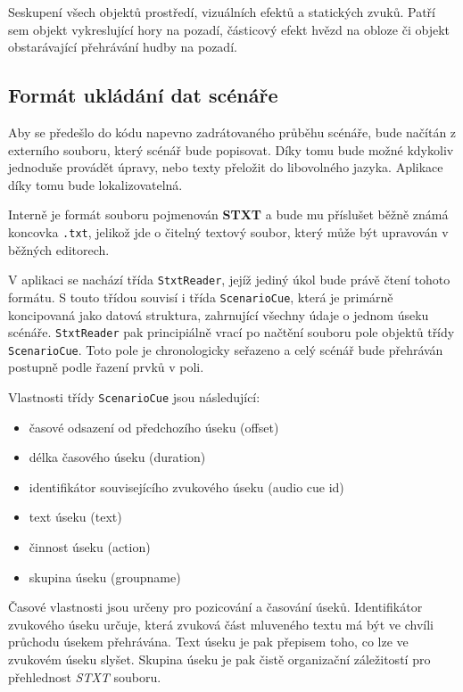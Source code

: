 Seskupení všech objektů prostředí, vizuálních efektů a
statických zvuků. Patří sem objekt vykreslující hory na pozadí,
částicový efekt hvězd na obloze či objekt obstarávající přehrávání hudby
na pozadí.

\subsection{Formát ukládání dat
scénáře}\label{formuxe1t-ukluxe1duxe1nuxed-dat-scuxe9nuxe1ux159e}

Aby se předešlo do kódu napevno zadrátovaného průběhu scénáře, bude
načítán z externího souboru, který scénář bude popisovat. Díky tomu bude
možné kdykoliv jednoduše provádět úpravy, nebo texty přeložit do
libovolného jazyka. Aplikace díky tomu bude lokalizovatelná.

Interně je formát souboru pojmenován \textbf{STXT} a bude mu příslušet
běžně známá koncovka \texttt{.txt}, jelikož jde o čitelný textový
soubor, který může být upravován v běžných editorech.

V aplikaci se nachází třída \texttt{StxtReader}, jejíž jediný úkol bude
právě čtení tohoto formátu. S touto třídou souvisí i třída 
\texttt{ScenarioCue}, která je primárně koncipovaná jako datová
struktura, zahrnující všechny údaje o jednom úseku scénáře.
\texttt{StxtReader} pak principiálně vrací po načtění souboru pole objektů třídy
\texttt{ScenarioCue}. Toto pole je chronologicky seřazeno a celý scénář
bude přehráván postupně podle řazení prvků v poli.

Vlastnosti třídy \texttt{ScenarioCue} jsou následující:

\begin{itemize}
\tightlist
\item
  časové odsazení od předchozího úseku (offset)
\item
  délka časového úseku (duration)
\item
  identifikátor souvisejícího zvukového úseku (audio cue id)
\item
  text úseku (text)
\item
  činnost úseku (action)
\item
  skupina úseku (groupname)
\end{itemize}

Časové vlastnosti jsou určeny pro pozicování a časování úseků.
Identifikátor zvukového úseku určuje, která zvuková část mluveného textu má být ve
chvíli průchodu úsekem přehrávána. Text úseku je pak přepisem toho, co
lze ve zvukovém úseku slyšet. Skupina úseku je pak čistě organizační
záležitostí pro přehlednost \emph{STXT} souboru.

